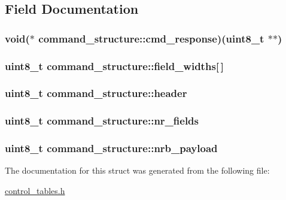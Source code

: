 \subsection{\-Field \-Documentation}
\hypertarget{structcommand__structure_aebeb85ab86cf52981c2294e0ff785717}{
\subsubsection[{cmd\-\_\-response}]{\setlength{\rightskip}{0pt plus 5cm}void($\ast$ {\bf command\-\_\-structure\-::cmd\-\_\-response})(uint8\-\_\-t $\ast$$\ast$)}}
\label{structcommand__structure_aebeb85ab86cf52981c2294e0ff785717}
\hypertarget{structcommand__structure_ac385bdc4001624f566e66b09e7dedcd3}{
\subsubsection[{field\-\_\-widths}]{\setlength{\rightskip}{0pt plus 5cm}uint8\-\_\-t {\bf command\-\_\-structure\-::field\-\_\-widths}\mbox{[}$\,$\mbox{]}}}
\label{structcommand__structure_ac385bdc4001624f566e66b09e7dedcd3}
\hypertarget{structcommand__structure_a448f375c590f94439eeed8c3287a1119}{
\subsubsection[{header}]{\setlength{\rightskip}{0pt plus 5cm}uint8\-\_\-t {\bf command\-\_\-structure\-::header}}}
\label{structcommand__structure_a448f375c590f94439eeed8c3287a1119}
\hypertarget{structcommand__structure_a6ea64013ccdb9f90c0b39d9103c93892}{
\subsubsection[{nr\-\_\-fields}]{\setlength{\rightskip}{0pt plus 5cm}uint8\-\_\-t {\bf command\-\_\-structure\-::nr\-\_\-fields}}}
\label{structcommand__structure_a6ea64013ccdb9f90c0b39d9103c93892}
\hypertarget{structcommand__structure_a4e170d613deb0c63c5f6053aa4dfc257}{
\subsubsection[{nrb\-\_\-payload}]{\setlength{\rightskip}{0pt plus 5cm}uint8\-\_\-t {\bf command\-\_\-structure\-::nrb\-\_\-payload}}}
\label{structcommand__structure_a4e170d613deb0c63c5f6053aa4dfc257}


\-The documentation for this struct was generated from the following file\-:\begin{DoxyCompactItemize}
\item 
\hyperlink{control__tables_8h}{control\-\_\-tables.\-h}\end{DoxyCompactItemize}
